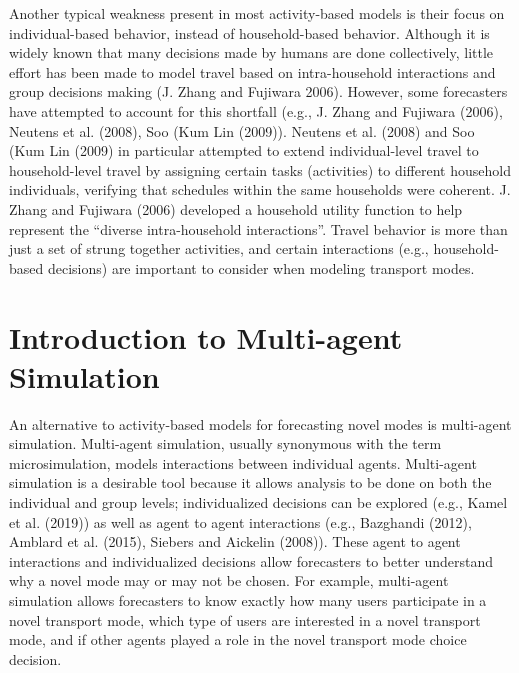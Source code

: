 \documentclass[12pt, oneside, openright]{byuthesis}
\begin{document}
Another typical weakness present in most activity-based models is their focus on individual-based behavior, instead of household-based behavior. Although it is widely known that many decisions made by humans are done collectively, little effort has been made to model travel based on intra-household interactions and group decisions making (J. Zhang and Fujiwara 2006). However, some forecasters have attempted to account for this shortfall (e.g., J. Zhang and Fujiwara (2006), Neutens et al. (2008), Soo (Kum Lin (2009)). Neutens et al. (2008) and Soo (Kum Lin (2009) in particular attempted to extend individual-level travel to household-level travel by assigning certain tasks (activities) to different household individuals, verifying that schedules within the same households were coherent. J. Zhang and Fujiwara (2006) developed a household utility function to help represent the ``diverse intra-household interactions''. Travel behavior is more than just a set of strung together activities, and certain interactions (e.g., household-based decisions) are important to consider when modeling transport modes.

\hypertarget{lit-mas}{%
\section{Introduction to Multi-agent Simulation}\label{lit-mas}}

An alternative to activity-based models for forecasting novel modes is multi-agent simulation. Multi-agent simulation, usually synonymous with the term microsimulation, models interactions between individual agents. Multi-agent simulation is a desirable tool because it allows analysis to be done on both the individual and group levels; individualized decisions can be explored (e.g., Kamel et al. (2019)) as well as agent to agent interactions (e.g., Bazghandi (2012), Amblard et al. (2015), Siebers and Aickelin (2008)). These agent to agent interactions and individualized decisions allow forecasters to better understand why a novel mode may or may not be chosen. For example, multi-agent simulation allows forecasters to know exactly how many users participate in a novel transport mode, which type of users are interested in a novel transport mode, and if other agents played a role in the novel transport mode choice decision.
\end{document}
